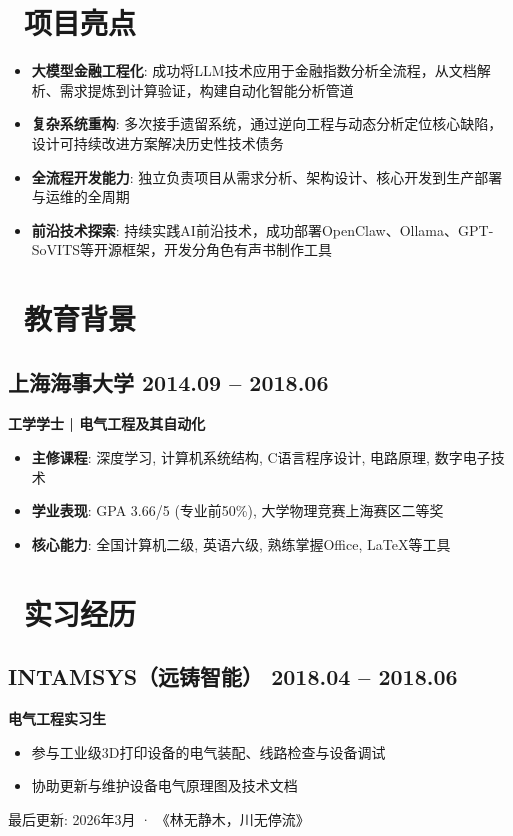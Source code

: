 \documentclass[11pt, a4paper]{article}
\newcommand{\dates}[1]{\hfill\textcolor{light}{\small #1}}  %
\begin{document}
\section*{\faStar\ 项目亮点}

\begin{itemize}
    \item \textbf{大模型金融工程化}: 成功将LLM技术应用于金融指数分析全流程，从文档解析、需求提炼到计算验证，构建自动化智能分析管道
    \item \textbf{复杂系统重构}: 多次接手遗留系统，通过逆向工程与动态分析定位核心缺陷，设计可持续改进方案解决历史性技术债务
    \item \textbf{全流程开发能力}: 独立负责项目从需求分析、架构设计、核心开发到生产部署与运维的全周期
    \item \textbf{前沿技术探索}: 持续实践AI前沿技术，成功部署OpenClaw、Ollama、GPT-SoVITS等开源框架，开发分角色有声书制作工具
\end{itemize}

\section*{\faGraduationCap\ 教育背景}

\subsection*{上海海事大学 \dates{2014.09 -- 2018.06}}
\textbf{工学学士 | 电气工程及其自动化}

\begin{itemize}
    \item \textbf{主修课程}: 深度学习, 计算机系统结构, C语言程序设计, 电路原理, 数字电子技术
    \item \textbf{学业表现}: GPA 3.66/5 (专业前50\%), 大学物理竞赛上海赛区二等奖
    \item \textbf{核心能力}: 全国计算机二级, 英语六级, 熟练掌握Office, LaTeX等工具
\end{itemize}

\section*{\faLaptopCode\ 实习经历}

\subsection*{INTAMSYS（远铸智能） \dates{2018.04 -- 2018.06}}
\textbf{电气工程实习生}

\begin{itemize}
    \item 参与工业级3D打印设备的电气装配、线路检查与设备调试
    \item 协助更新与维护设备电气原理图及技术文档
\end{itemize}

\vfill
\begin{center}
    \small\textcolor{light}{最后更新: 2026年3月 · 《林无静木，川无停流》}
\end{center}
\end{document}
